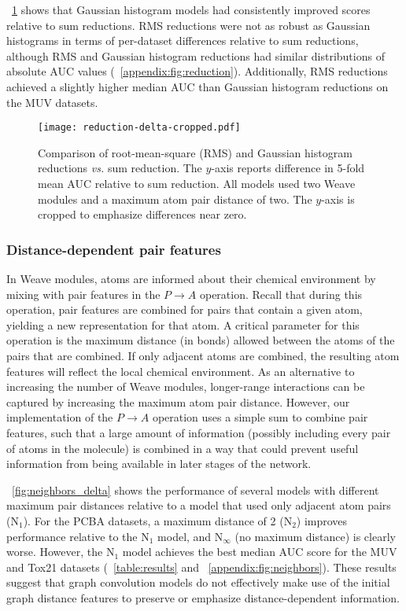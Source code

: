\figurename~\ref{fig:reduction_delta} shows that Gaussian histogram models had
consistently improved scores relative to sum reductions. RMS reductions were not
as robust as Gaussian histograms in terms of per-dataset differences relative to
sum reductions, although RMS and Gaussian histogram reductions had similar
distributions of absolute AUC values (\figurename~\ref{appendix:fig:reduction}).
Additionally, RMS reductions achieved a slightly higher median AUC than Gaussian
histogram reductions on the MUV datasets.

\begin{figure}[tb]
\centering
  \texttt{[image: reduction-delta-cropped.pdf]}
  \caption{
    Comparison of root-mean-square (RMS) and Gaussian histogram reductions
    \emph{vs.} sum reduction. The $y$-axis reports difference in 5-fold mean AUC
    relative to sum reduction. All models used two Weave modules and a maximum
    atom pair distance of two. The $y$-axis is cropped to emphasize differences
    near zero.
  }
  \label{fig:reduction_delta}
\end{figure}

\subsubsection{Distance-dependent pair features}
\label{sec:neighbors}

In Weave modules, atoms are informed about their chemical environment by
mixing with pair features in the $P \rightarrow A$ operation. Recall that during
this operation, pair features are combined for pairs that contain a given
atom, yielding a new representation for that atom. A critical parameter for this
operation is the maximum distance (in bonds) allowed between the atoms of the
pairs that are combined. If only adjacent atoms are combined, the resulting
atom features will reflect the local chemical environment. As an alternative to
increasing the number of Weave modules, longer-range interactions can be
captured by increasing the maximum atom pair distance. However, our
implementation of the $P \rightarrow A$ operation uses a simple sum to combine
pair features, such that a large amount of information (possibly including every
pair of atoms in the molecule) is combined in a way that could prevent
useful information from being available in later stages of the network.

\figurename~\ref{fig:neighbors_delta} shows the performance of several models
with different maximum pair distances relative to a model that used only
adjacent atom pairs (N$_1$). For the PCBA datasets, a maximum distance of 2
(N$_2$) improves performance relative to the N$_1$ model, and N$_\infty$ (no
maximum distance) is clearly worse. However, the N$_1$ model achieves the best
median AUC score for the MUV and Tox21 datasets (\tablename~\ref{table:results}
and \figurename~\ref{appendix:fig:neighbors}). These results suggest that graph convolution models do not
effectively make use of the initial graph distance features to preserve or
emphasize distance-dependent information.

